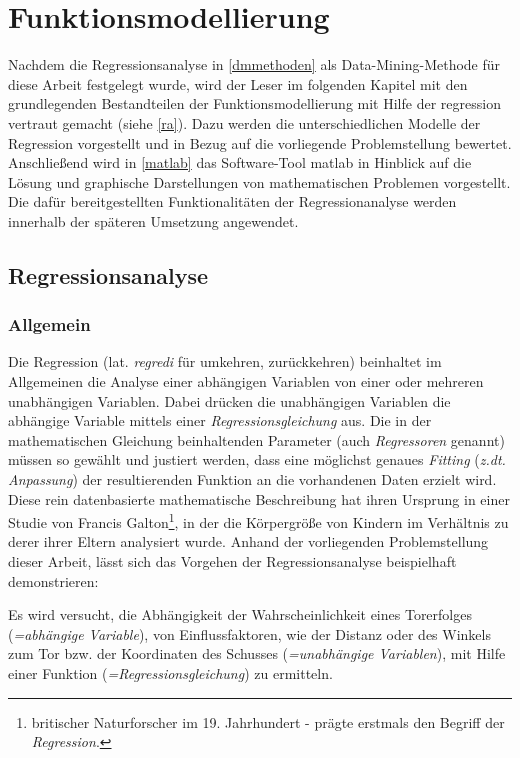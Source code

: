 \section{Funktionsmodellierung}
\label{fm}
Nachdem die Regressionsanalyse in \vref{dmmethoden} als Data-Mining-Methode für diese Arbeit festgelegt wurde, wird der Leser im folgenden Kapitel mit den grundlegenden Bestandteilen der Funktionsmodellierung mit Hilfe der \gls{regression} vertraut gemacht (siehe \vref{ra}). Dazu werden die unterschiedlichen Modelle der Regression vorgestellt und in Bezug auf die vorliegende Problemstellung bewertet. Anschließend wird in \vref{matlab} das Software-Tool \gls{matlab} in Hinblick auf die Lösung und graphische Darstellungen von mathematischen Problemen vorgestellt. Die dafür bereitgestellten Funktionalitäten der Regressionanalyse werden innerhalb der späteren Umsetzung angewendet.


\subsection{Regressionsanalyse}
\label{ra}
\subsubsection{Allgemein}
Die Regression (lat. \textit{regredi} für umkehren, zurückkehren) beinhaltet im Allgemeinen die Analyse einer abhängigen Variablen von einer oder mehreren unabhängigen Variablen. Dabei drücken die unabhängigen Variablen die abhängige Variable mittels einer \textit{Regressionsgleichung} aus. Die in der mathematischen Gleichung beinhaltenden Parameter (auch \textit{Regressoren} genannt) müssen so gewählt und justiert werden, dass eine möglichst genaues \textit{Fitting} (\textit{z.dt. Anpassung}) der resultierenden Funktion an die vorhandenen Daten erzielt wird. Diese rein datenbasierte mathematische Beschreibung hat ihren Ursprung in einer Studie von Francis Galton\footnote{britischer Naturforscher im 19. Jahrhundert - prägte erstmals den Begriff der \textit{Regression}.}, in der die Körpergröße von Kindern im Verhältnis zu derer ihrer Eltern analysiert wurde. Anhand der vorliegenden Problemstellung dieser Arbeit, lässt sich das Vorgehen der Regressionsanalyse beispielhaft demonstrieren:

Es wird versucht, die Abhängigkeit der Wahrscheinlichkeit eines Torerfolges (\textit{=abhängige Variable}), von Einflussfaktoren, wie der Distanz oder des Winkels zum Tor bzw. der Koordinaten des Schusses (\textit{=unabhängige Variablen}), mit Hilfe einer Funktion (\textit{=Regressionsgleichung}) zu ermitteln. 

